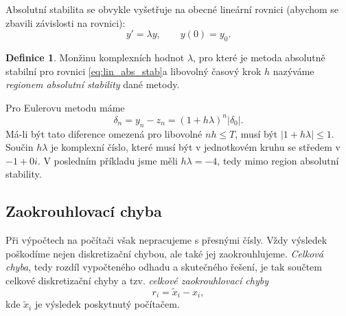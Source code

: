 \documentclass[a4paper, 12pt]{book}
\theoremstyle{definition}
\newtheorem{definition}[theorem]{Definice}
\def\abs#1{\lvert#1\rvert}
\def\df#1{\emph{#1}}
\begin{document}
Absolutní stabilita se obvykle vyšetřuje na obecné lineární rovnici (abychom se zbavili závislosti na rovnici):
\[
  y' = \lambda y,\qquad y(0) =y_0.
\]

\begin{definition}
 Monžinu komplexních hodnot $\lambda$, pro které  je metoda absolutně stabilní pro rovnici \eqref{eq:lin_abs_stab}a libovolný časový krok $h$
 nazýváme \df{regionem absolutní stability} dané metody.
\end{definition}

Pro Eulerovu metodu máme
\[
    \delta_n = y_n - z_n = (1+h\lambda)^n \abs{\delta_0}.
\]
Má-li být tato diference omezená pro libovolné $nh\le T$, musí být $\abs{1+h\lambda}\le 1$. Součin $h\lambda$ je komplexní číslo, které musí být v jednotkovém kruhu se středem v $-1+0i$. 
V posledním příkladu jsme měli $h\lambda = -4$, tedy mimo region absolutní stability.







\subsection{Zaokrouhlovací chyba}

Při výpočtech na počítači však nepracujeme s přesnými čísly. Vždy výsledek poškodíme
nejen diskretizační chybou, ale také jej zaokrouhlujeme. {\em Celková chyba}, tedy
rozdíl vypočteného odhadu a skutečného řešení, je tak součtem celkové diskretizační 
chyby a tzv. {\em celkové zaokrouhlovací chyby}
\begin{equation}\label{zaokrch}
r_i=\tilde x_i-x_i,
\end{equation}
kde $\tilde x_i$ je výsledek poskytnutý počítačem.
\end{document}
